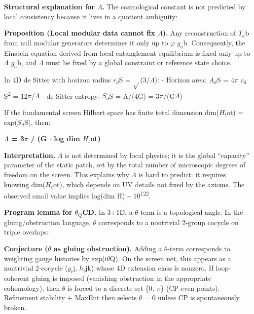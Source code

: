 \documentclass[11pt,a4paper]{article}
\theoremstyle{remark}
\begin{document}
\textbf{Structural explanation for \ensuremath{\Lambda}.} The cosmological constant is not predicted by local consistency because it lives in a quotient ambiguity:

\textbf{Proposition (Local modular data cannot fix \ensuremath{\Lambda}).} Any reconstruction of \(T_a\)b from null modular generators determines it only up to \ensuremath{\varphi} \(g_a\)b. Consequently, the Einstein equation derived from local entanglement equilibrium is fixed only up to \ensuremath{\Lambda} \(g_a\)b, and \ensuremath{\Lambda} must be fixed by a global constraint or reference state choice.

In 4D de Sitter with horizon radius \(r_d\)S = \ensuremath{\sqrt{}}(3/\ensuremath{\Lambda}):
- Horizon area: \(A_d\)S = 4\ensuremath{\pi} \(r_d\)S\textsuperscript{2} = 12\ensuremath{\pi}/\ensuremath{\Lambda}
- de Sitter entropy: \(S_d\)S = A/(4G) = 3\ensuremath{\pi}/(G\ensuremath{\Lambda})

If the fundamental screen Hilbert space has finite total dimension dim(\(H_t\)ot) = exp(\(S_d\)S), then:

\textbf{\ensuremath{\Lambda} = 3\ensuremath{\pi} / (G \ensuremath{\cdot} log dim \(H_t\)ot)}

\textbf{Interpretation.} \ensuremath{\Lambda} is not determined by local physics; it is the global ``capacity'' parameter of the static patch, set by the total number of microscopic degrees of freedom on the screen. This explains why \ensuremath{\Lambda} is hard to predict: it requires knowing dim(\(H_t\)ot), which depends on UV details not fixed by the axioms. The observed small value implies log(dim H) \textasciitilde{} 10\textsuperscript{122}.

\textbf{Program lemma for \(\ensuremath{\theta}_Q\)CD.} In 3+1D, a \ensuremath{\theta}-term is a topological angle. In the gluing/obstruction language, \ensuremath{\theta} corresponds to a nontrivial 2-group cocycle on triple overlaps:

\textbf{Conjecture (\ensuremath{\theta} as gluing obstruction).} Adding a \ensuremath{\theta}-term corresponds to weighting gauge histories by exp(i\ensuremath{\theta}Q). On the screen net, this appears as a nontrivial 2-cocycle (\(g_i\)j, \(h_i\)jk) whose 4D extension class is nonzero. If loop-coherent gluing is imposed (vanishing obstruction in the appropriate cohomology), then \ensuremath{\theta} is forced to a discrete set \{0, \ensuremath{\pi}\} (CP-even points). Refinement stability + MaxEnt then selects \ensuremath{\theta} = 0 unless CP is spontaneously broken.
\end{document}
